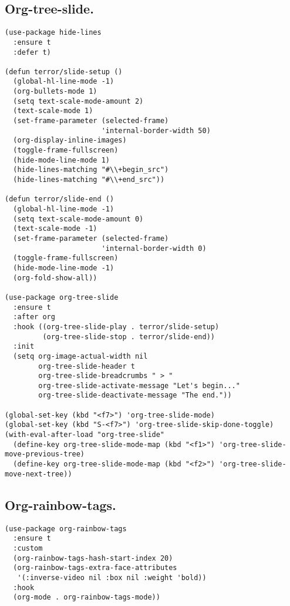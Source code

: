 \documentclass[11pt]{article}
\begin{document}
\subsection{Org-tree-slide.}
\label{sec:org9935e2b}
\begin{verbatim}
(use-package hide-lines
  :ensure t
  :defer t)

(defun terror/slide-setup ()
  (global-hl-line-mode -1)
  (org-bullets-mode 1)
  (setq text-scale-mode-amount 2)
  (text-scale-mode 1)
  (set-frame-parameter (selected-frame)
                       'internal-border-width 50)
  (org-display-inline-images)
  (toggle-frame-fullscreen)
  (hide-mode-line-mode 1)
  (hide-lines-matching "#\\+begin_src")
  (hide-lines-matching "#\\+end_src"))

(defun terror/slide-end ()
  (global-hl-line-mode -1)
  (setq text-scale-mode-amount 0)
  (text-scale-mode -1)
  (set-frame-parameter (selected-frame)
                       'internal-border-width 0)
  (toggle-frame-fullscreen)
  (hide-mode-line-mode -1)
  (org-fold-show-all))

(use-package org-tree-slide
  :ensure t
  :after org
  :hook ((org-tree-slide-play . terror/slide-setup)
         (org-tree-slide-stop . terror/slide-end))
  :init
  (setq org-image-actual-width nil
        org-tree-slide-header t
        org-tree-slide-breadcrumbs " > "
        org-tree-slide-activate-message "Let's begin..."
        org-tree-slide-deactivate-message "The end."))

(global-set-key (kbd "<f7>") 'org-tree-slide-mode)
(global-set-key (kbd "S-<f7>") 'org-tree-slide-skip-done-toggle)
(with-eval-after-load "org-tree-slide"
  (define-key org-tree-slide-mode-map (kbd "<f1>") 'org-tree-slide-move-previous-tree)
  (define-key org-tree-slide-mode-map (kbd "<f2>") 'org-tree-slide-move-next-tree))
\end{verbatim}
\subsection{Org-rainbow-tags.}
\label{sec:orgc030792}
\begin{verbatim}
(use-package org-rainbow-tags
  :ensure t
  :custom
  (org-rainbow-tags-hash-start-index 20)
  (org-rainbow-tags-extra-face-attributes
   '(:inverse-video nil :box nil :weight 'bold))
  :hook
  (org-mode . org-rainbow-tags-mode))
\end{verbatim}
\end{document}

